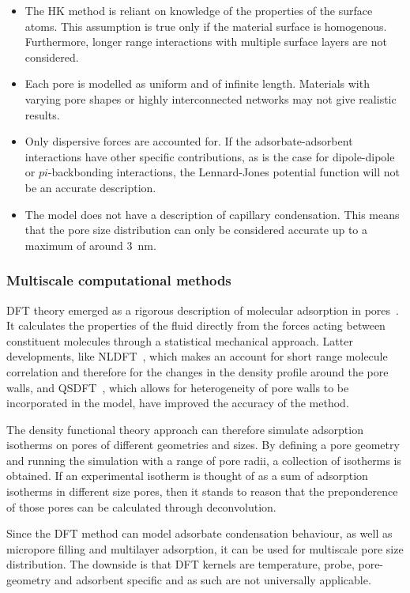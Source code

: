 \begin{itemize}

	\item The \gls{HK} method is reliant on knowledge of the properties of
	      the surface atoms. This assumption is true only if the
	      material surface is homogenous. Furthermore,
	      longer range interactions with multiple surface layers are
	      not considered.
	\item Each pore is modelled as uniform and of infinite length.
	      Materials with varying pore shapes or highly interconnected
	      networks may not give realistic results.
	\item Only dispersive forces are accounted for.
	      If the adsorbate-adsorbent interactions
	      have other specific contributions, as is the case
	      for dipole-dipole or \(pi\)-backbonding interactions,
	      the Lennard-Jones potential function will not be
	      an accurate description.
	\item The model does not have a description of capillary condensation.
	      This means that the pore size distribution can only
	      be considered accurate up to a maximum of around
	      \SI{3}{\nano\metre}.

\end{itemize}

\subsubsection{Multiscale computational methods}

\gls{DFT} theory emerged as a rigorous description of molecular
adsorption in pores~\cite{seatonNewAnalysisMethod1989}.
It calculates the properties of the fluid
directly from the forces acting between constituent molecules
through a statistical mechanical approach. Latter developments,
like \gls{NLDFT}~\cite{tarazonaPhaseEquilibriaFluid1987},
which makes an account for short range molecule correlation
and therefore for the changes in the density profile
around the pore walls, and \gls{QSDFT}~\cite{neimarkQuenchedSolidDensity2009}, 
which allows for heterogeneity of pore walls to be incorporated in the model,
have improved the accuracy of the method.

The density functional theory approach can therefore simulate
adsorption isotherms on pores of different geometries and sizes.
By defining a pore geometry and running the simulation with a
range of pore radii, a collection of isotherms is obtained.
If an experimental isotherm is thought of as a sum of
adsorption isotherms in different size pores, then it stands
to reason that the preponderence of those pores can be calculated
through deconvolution.

Since the \gls{DFT} method can model adsorbate condensation behaviour,
as well as micropore filling and multilayer adsorption, it can
be used for multiscale pore size distribution. The downside is
that \gls{DFT} kernels are temperature, probe, pore-geometry and
adsorbent specific and as such are not universally applicable.
